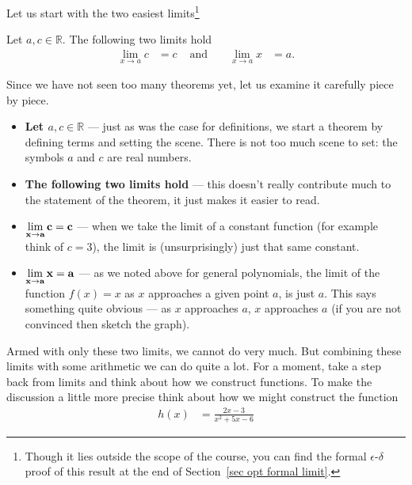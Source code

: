 Let us start with the two easiest limits\footnote{Though it lies outside the
scope of the course, you can find the formal $\epsilon$-$\delta$ proof of this
result at the end of Section~\ref{sec opt formal limit}.}
\begin{theorem}\label{thm_easy_lim}
\label{thm easy lim}
   Let $a,c \in \mathbb{R}$. The following two limits hold
  \begin{align*}
  \lim_{x \to a} c & = c & \text{ and }&&
  \lim_{x \to a} x &= a.
\end{align*}
\end{theorem}

Since we have not seen too many theorems yet, let us examine it carefully piece
by piece.
\begin{itemize}
 \item \textbf{Let $a,c \in \mathbb{R}$} --- just as was the case for
definitions, we start a theorem by defining terms and setting the scene. There
is not too much scene to set: the symbols $a$ and $c$ are real numbers.
 \item \textbf{The following two limits hold} --- this doesn't really
contribute much to the statement of the theorem, it just makes it easier to
read.
 \item $\displaystyle \mathbf{\lim_{x \to a} c  = c}$  --- when we take the
limit of a
constant function (for example think of $c=3$), the limit is (unsurprisingly)
just that same constant.
 \item $\displaystyle \mathbf{\lim_{x \to a} x = a}$ --- as we noted above for general
polynomials, the limit of the function $f(x) = x$ as $x$ approaches a given
point $a$, is just $a$. This says something quite obvious --- as $x$ approaches
$a$, $x$ approaches $a$ (if you are not convinced then sketch the graph).
\end{itemize}


Armed with only these two limits, we cannot do very much. But combining these
limits with some arithmetic we can do quite a lot. For a moment, take a step
back from limits and think about how we construct functions. To
make the discussion a little more precise think about how we might construct
the function
\begin{align*}
  h(x) &= \frac{2x-3}{x^2+5x-6}
\end{align*}

